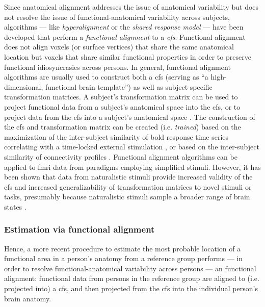 Since anatomical alignment addresses the issue of anatomical variability but
does not resolve the issue of functional-anatomical variability across subjects,
algorithms --- like \textit{hyperalignment} \citep{haxby2011common,
guntupalli2016model} or the \textit{shared response model}
\citep{chen2015reduced, zhang2016searchlight} --- have been developed that
perform a \textit{functional alignment} to a \textit{\ac{cfs}}.
%
Functional alignment does not align voxels (or surface vertices) that share the
same anatomical location but voxels that share similar functional properties in
order to preserve functional idiosyncrasies across persons.
%
In general, functional alignment algorithms are usually used to construct both a
\ac{cfs} (serving as ``a high-dimensional, functional brain template'') as well
as subject-specific transformation matrices.
%
A subject's transformation matrix can be used to project functional data from a
subject's anatomical space into the \ac{cfs}, or to project data from the
\ac{cfs} into a subject's anatomical space \citep{haxby2020hyperalignment}.
%
The construction of the \ac{cfs} and transformation matrix can be created (i.e.
\textit{trained}) based on the maximization of the inter-subject similarity of
\ac{bold} response time series correlating with a time-locked external
stimulation \citep{haxby2011common, chen2015reduced, sabuncu2010function}, or
based on the inter-subject similarity of connectivity profiles
\citep{feilong2018reliable, guntupalli2018computational, nastase2019leveraging}.
%
Functional alignment algorithms can be applied to \ac{fmri} data from paradigms
employing simplified stimuli.
%
However, it has been shown that data from naturalistic stimuli provide increased
validity of the \ac{cfs} and increased generalizability of transformation
matrices to novel stimuli or tasks, presumably because naturalistic stimuli
sample a broader range of brain states \citep{haxby2011common,
guntupalli2016model}.


\subsubsection{Estimation via functional alignment}

%
Hence, a more recent procedure to estimate the most probable location of a
functional area in a person's anatomy from a reference group performs --- in
order to resolve functional-anatomical variability across persons --- an
functional alignment:
%
functional data from persons in the reference group are aligned to (i.e.
projected into) a \ac{cfs}, and then projected from the \ac{cfs} into the
individual person's brain anatomy.


